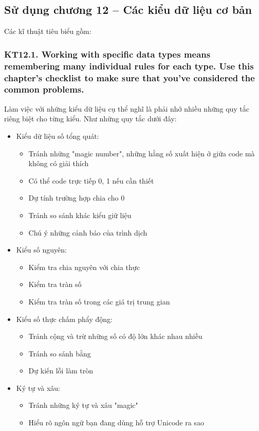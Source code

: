 \documentclass[12pt]{report}
\begin{document}
\subsection{Sử dụng chương 12 -- Các kiểu dữ liệu cơ bản}
\noindent Các kĩ thuật tiêu biểu gồm:
\subsubsection{KT12.1. Working with specific data types means remembering many individual rules for each type. Use this chapter's checklist to make sure that you've considered the common problems.}

	Làm việc với những kiểu dữ liệu cụ thể nghĩ là phải nhớ nhiều những quy tắc riêng biệt cho từng kiểu. Như những quy tắc dưới đây:
\begin{itemize}
	\item Kiểu dữ liệu số tổng quát:
		\begin{itemize}
			\item Tránh những "magic number", những hằng số xuất hiện ở giữa code mà không có giải thích
			\item Có thể code trực tiếp 0, 1 nếu cần thiết
			\item Dự tính trường hợp chia cho 0
			\item Tránh so sánh khác kiểu giữ liệu 
			\item Chú ý những cảnh báo của trình dịch 
		\end{itemize}
	\item Kiểu số nguyên:
		\begin{itemize}
			\item Kiểm tra chia nguyên với chia thực 
			\item Kiểm tra tràn số
			\item Kiểm tra tràn số trong các giá trị trung gian
		\end{itemize}
	\item Kiểu số thực chấm phẩy động:
		\begin{itemize}
			\item Tránh cộng và trừ những số có độ lớn khác nhau nhiều
			\item Tránh so sánh bằng 
			\item Dự kiến lỗi làm tròn 
		\end{itemize}
	\item Ký tự và xâu:
		\begin{itemize}
			\item Tránh những ký tự và xâu "magic"
			\item Hiểu rõ ngôn ngữ bạn đang dùng hỗ trợ Unicode ra sao 

\end{itemize}
\end{itemize}
\end{document}

